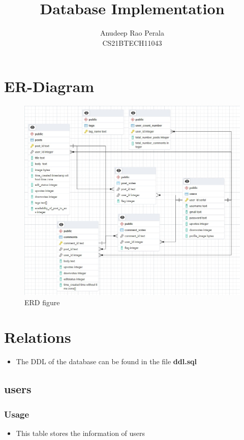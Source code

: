 \documentclass[12pt,a4paper]{article}
\title{Database Implementation}
\author{ Anudeep Rao Perala \\ CS21BTECH11043 }
\date{}
\begin{document}
	\maketitle
	
	\tableofcontents
	\newpage
	
	\section{ER-Diagram}
		\begin{figure}[H]
		\centering
		\includegraphics[width=1\textwidth]{ER_dig}
		\caption{ERD figure}
	\end{figure}
\newpage
	\section{Relations}
	\begin{itemize}
		\item   The DDL of the database can be found in the file \textbf{ddl.sql}
	\end{itemize}
	\subsection{users}
	\subsubsection{Usage}
		\begin{itemize}
		\item This table stores the information of users
	\end{itemize}
\end{document}
